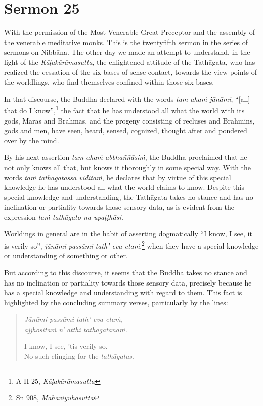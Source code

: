 \chapter{Sermon 25}

\NibbanaOpeningQuote

With the permission of the Most Venerable Great Preceptor and the assembly of the venerable meditative monks. This is the twentyfifth sermon in the series of sermons on Nibbāna. The other day we made an attempt to understand, in the light of the \emph{Kāḷakārāmasutta}, the enlightened attitude of the Tathāgata, who has realized the cessation of the six bases of sense-contact, towards the view-points of the worldlings, who find themselves confined within those six bases.

In that discourse, the Buddha declared with the words \emph{tam ahaṁ jānāmi}, ``[all] that do I know'',\footnote{A II 25, \emph{Kāḷakārāmasutta}} the fact that he has understood all what the world with its gods, Māras and Brahmas, and the progeny consisting of recluses and Brahmins, gods and men, have seen, heard, sensed, cognized, thought after and pondered over by the mind.

By his next assertion \emph{tam ahaṁ abbhaññāsiṁ}, the Buddha proclaimed that he not only knows all that, but knows it thoroughly in some special way. With the words \emph{taṁ tathāgatassa viditaṁ}, he declares that by virtue of this special knowledge he has understood all what the world claims to know. Despite this special knowledge and understanding, the Tathāgata takes no stance and has no inclination or partiality towards those sensory data, as is evident from the expression \emph{taṁ tathāgato na upaṭṭhāsi.}

Worldings in general are in the habit of asserting dogmatically ``I know, I see, it is verily so'', \emph{jānāmi passāmi tath' eva etaṁ},\footnote{Sn 908, \emph{Mahāviyūhasutta}} when they have a special knowledge or understanding of something or other.

But according to this discourse, it seems that the Buddha takes no stance and has no inclination or partiality towards those sensory data, precisely because he has a special knowledge and understanding with regard to them. This fact is highlighted by the concluding summary verses, particularly by the lines:

\begin{quote}
\emph{Jānāmi passāmi tath' eva etaṁ,}\\
\emph{ajjhositaṁ n' atthi tathāgatānaṁ.}

I know, I see, 'tis verily so.\\
No such clinging for the \emph{tathāgatas}.
\end{quote}

